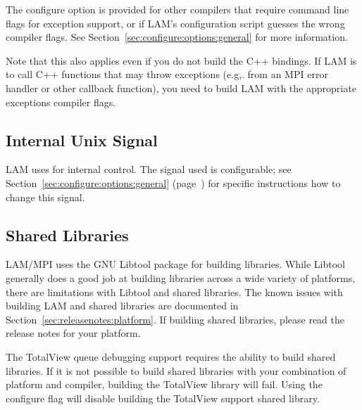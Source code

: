 The configure option  is provided for
other compilers that require command line flags for exception support,
or if LAM's configuration script guesses the wrong compiler flags.
See Section~\ref{sec:configure:options:general} for more information.

Note that this also applies even if you do not build the C++ bindings.
If LAM is to call C++ functions that may throw exceptions (e.g,. from
an MPI error handler or other callback function), you need to build
LAM with the appropriate exceptions compiler flags.

  

\subsection{Internal Unix Signal}
  
LAM uses  for internal control.  The signal used is
configurable; see Section~\ref{sec:configure:options:general}
(page~\pageref{sec:configure:options:general}) for specific
instructions how to change this signal.


\subsection{Shared Libraries}
\label{sec:releasenotes:sharedlib}

LAM/MPI uses the GNU Libtool package for building
libraries.  While Libtool generally does a good job at building
libraries across a wide variety of platforms, there are limitations
with Libtool and shared libraries.  The known issues with building LAM
and shared libraries are documented in
Section~\ref{sec:releasenotes:platform}.  If building shared
libraries, please read the release notes for your platform.

The TotalView queue debugging support requires the ability to build
shared libraries.  If it is not possible to build shared libraries
with your combination of platform and compiler, building the TotalView
library will fail.  Using the  configure
flag will disable building the TotalView support shared library.



